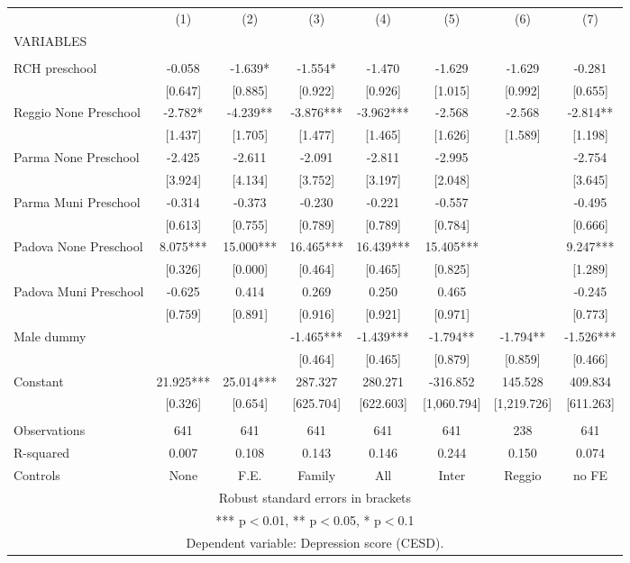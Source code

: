 \begin{tabular}{lccccccc} \hline
 & (1) & (2) & (3) & (4) & (5) & (6) & (7) \\
VARIABLES &  &  &  &  &  &  &  \\ \hline
 &  &  &  &  &  &  &  \\
RCH preschool & -0.058 & -1.639* & -1.554* & -1.470 & -1.629 & -1.629 & -0.281 \\
 & [0.647] & [0.885] & [0.922] & [0.926] & [1.015] & [0.992] & [0.655] \\
Reggio None Preschool & -2.782* & -4.239** & -3.876*** & -3.962*** & -2.568 & -2.568 & -2.814** \\
 & [1.437] & [1.705] & [1.477] & [1.465] & [1.626] & [1.589] & [1.198] \\
Parma None Preschool & -2.425 & -2.611 & -2.091 & -2.811 & -2.995 &  & -2.754 \\
 & [3.924] & [4.134] & [3.752] & [3.197] & [2.048] &  & [3.645] \\
Parma Muni Preschool & -0.314 & -0.373 & -0.230 & -0.221 & -0.557 &  & -0.495 \\
 & [0.613] & [0.755] & [0.789] & [0.789] & [0.784] &  & [0.666] \\
Padova None Preschool & 8.075*** & 15.000*** & 16.465*** & 16.439*** & 15.405*** &  & 9.247*** \\
 & [0.326] & [0.000] & [0.464] & [0.465] & [0.825] &  & [1.289] \\
Padova Muni Preschool & -0.625 & 0.414 & 0.269 & 0.250 & 0.465 &  & -0.245 \\
 & [0.759] & [0.891] & [0.916] & [0.921] & [0.971] &  & [0.773] \\
Male dummy &  &  & -1.465*** & -1.439*** & -1.794** & -1.794** & -1.526*** \\
 &  &  & [0.464] & [0.465] & [0.879] & [0.859] & [0.466] \\
Constant & 21.925*** & 25.014*** & 287.327 & 280.271 & -316.852 & 145.528 & 409.834 \\
 & [0.326] & [0.654] & [625.704] & [622.603] & [1,060.794] & [1,219.726] & [611.263] \\
 &  &  &  &  &  &  &  \\
Observations & 641 & 641 & 641 & 641 & 641 & 238 & 641 \\
R-squared & 0.007 & 0.108 & 0.143 & 0.146 & 0.244 & 0.150 & 0.074 \\
 Controls & None & F.E. & Family & All & Inter & Reggio & no FE \\ \hline
\multicolumn{8}{c}{ Robust standard errors in brackets} \\
\multicolumn{8}{c}{ *** p$<$0.01, ** p$<$0.05, * p$<$0.1} \\
\multicolumn{8}{c}{ Dependent variable: Depression score (CESD).} \\
\end{tabular}
